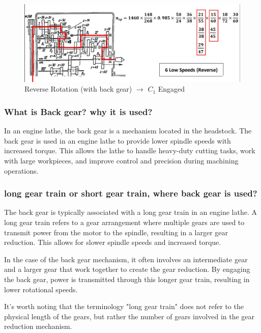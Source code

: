 \documentclass{article}
\begin{document}
\begin{figure}[h] 
  \centering
  \includegraphics[width=\linewidth]{img/long_gear_with_back.jpeg}
  \caption{Reverse Rotation (with back gear) $\rightarrow$ $C_1$ Engaged}
\end{figure}

\subsubsection*{What is Back gear? why it is used?}
In an engine lathe, the back gear is a mechanism located in the headstock. The back gear is used in an engine lathe to provide lower spindle speeds with increased torque. This allows the lathe to handle heavy-duty cutting tasks, work with large workpieces, and improve control and precision during machining operations.

\subsubsection*{long gear train or short gear train, where back gear is used?}
The back gear is typically associated with a long gear train in an engine lathe. A long gear train refers to a gear arrangement where multiple gears are used to transmit power from the motor to the spindle, resulting in a larger gear reduction. This allows for slower spindle speeds and increased torque.

In the case of the back gear mechanism, it often involves an intermediate gear and a larger gear that work together to create the gear reduction. By engaging the back gear, power is transmitted through this longer gear train, resulting in lower rotational speeds.

It's worth noting that the terminology "long gear train" does not refer to the physical length of the gears, but rather the number of gears involved in the gear reduction mechanism.
\end{document}
